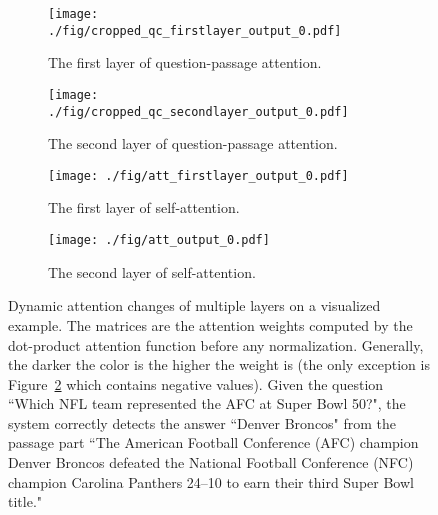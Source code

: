 \documentclass{article} \usepackage{arxiv, times}
\begin{document}
\begin{figure}[t]
\centering
\begin{subfigure}{.5\textwidth}
  \centering
  \texttt{[image: ./fig/cropped\_qc\_firstlayer\_output\_0.pdf]}
  \caption{The first layer of question-passage attention.}
  \label{fig:qp-l1}
\end{subfigure}\begin{subfigure}{.5\textwidth}
  \centering
  \texttt{[image: ./fig/cropped\_qc\_secondlayer\_output\_0.pdf]}
  \caption{The second layer of question-passage attention.}
  \label{fig:qp-l2}
\end{subfigure}
\begin{subfigure}{.5\textwidth}
  \centering
  \texttt{[image: ./fig/att\_firstlayer\_output\_0.pdf]}
  \caption{The first layer of self-attention.}
  \label{fig:self-l1}
\end{subfigure}\begin{subfigure}{.5\textwidth}
  \centering
  \texttt{[image: ./fig/att\_output\_0.pdf]}
  \caption{The second layer of self-attention.}
  \label{fig:self-l2}
\end{subfigure}
\caption{Dynamic attention changes of multiple layers on a visualized example. The matrices are the attention weights computed by the dot-product attention function before any normalization. Generally, the darker the color is the higher the weight is (the only exception is Figure~\ref{fig:qp-l2} which contains negative values). Given the question ``Which NFL team represented the AFC at Super Bowl 50?", the system correctly detects the answer ``Denver Broncos" from the passage part ``The American Football Conference (AFC) champion Denver Broncos defeated the National Football Conference (NFC) champion Carolina Panthers 24–10 to earn their third Super Bowl title."}
\label{fig:dynamic-changes}
\end{figure}
\end{document}
